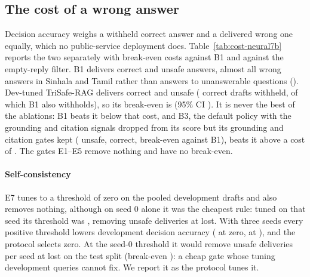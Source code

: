 \subsection{The cost of a wrong answer}\label{sec:cost}

Decision accuracy weighs a withheld correct answer and a delivered wrong one equally, which no public-service deployment does. Table~\ref{tab:cost-neural7b} reports the two separately with break-even costs against B1 and against the empty-reply filter. B1 delivers \LBoneCorrect{} correct and \LBoneUnsafe{} unsafe answers, almost all wrong answers in Sinhala and Tamil rather than answers to unanswerable questions (\LBoneUnsafeUnans). Dev-tuned TriSafe-RAG delivers \LTunCorrect{} correct and \LTunUnsafe{} unsafe (\LTunLost{} correct drafts withheld, \LBoneLost{} of which B1 also withholds), so its break-even is \LTunBreakEven{} (95\% CI \LTunBreakEvenCI). It is never the best of the ablations: B1 beats it below that cost, and B3, the default policy with the grounding and citation signals dropped from its score but its grounding and citation gates kept (\LBthreeUnsafe{} unsafe, \LBthreeCorrect{} correct, break-even \LBthreeBreakEven{} against B1), beats it above a cost of \LCrossTunBthree. The gates E1--E5 remove nothing and have no break-even.

\paragraph{Self-consistency} E7 tunes to a threshold of zero on the pooled development drafts and also removes nothing, although on seed 0 alone it was the cheapest rule: tuned on that seed its threshold was \LEsevenFixThr, removing \LEsevenFixRemovedSeedZero{} unsafe deliveries at \LEsevenFixLostSeedZero{} lost. With three seeds every positive threshold lowers development decision accuracy (\LEsevenDevDecZero{} at zero, \LEsevenDevDecFix{} at \LEsevenFixThr), and the protocol selects zero. At the seed-0 threshold it would remove \LEsevenFixRemoved{} unsafe deliveries per seed at \LEsevenFixLost{} lost on the test split (break-even \LEsevenFixBreakEven): a cheap gate whose tuning \Lndev{} development queries cannot fix. We report it as the protocol tunes it.

